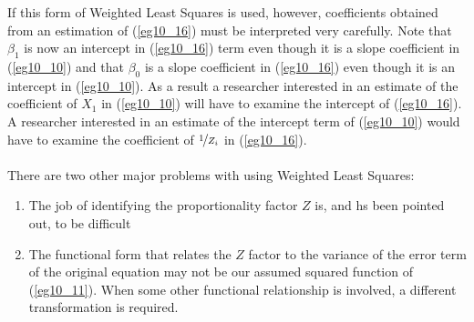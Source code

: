 \documentclass[11pt]{article}
\begin{document}
If this form of Weighted Least Squares is used, however, coefficients obtained from an estimation of (\ref{eg10_16}) must be interpreted very carefully. Note that $\beta_1$ is now an intercept in (\ref{eg10_16}) term even though it is a slope coefficient in (\ref{eg10_10}) and that $\beta_0$ is a slope coefficient in (\ref{eg10_16}) even though it is an intercept in (\ref{eg10_10}). As a result a researcher interested in an estimate of the coefficient of $X_1$ in (\ref{eg10_10}) will have to examine the intercept of (\ref{eg10_16}). A researcher interested in an estimate of the intercept term of (\ref{eg10_10}) would have to examine the coefficient of $\nicefrac{1}{Z_i}$ in (\ref{eg10_16}). \\ \\
There are two other major problems with using Weighted Least Squares:
\begin{enumerate}
\item The job of identifying the proportionality factor $Z$ is, and hs been pointed out, to be difficult
\item The functional form that relates the $Z$ factor to the variance of the error term of the original equation may not be our assumed squared function of (\ref{eg10_11}). When some other functional relationship is involved, a different transformation is required.
\end{enumerate}
\end{document}
